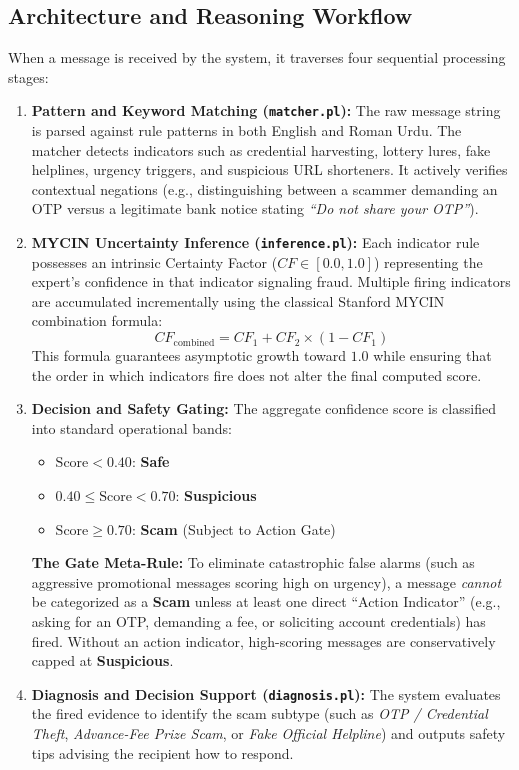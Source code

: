 \documentclass[11pt,a4paper]{article}
\begin{document}
\subsection{Architecture and Reasoning Workflow}
When a message is received by the system, it traverses four sequential processing stages:
\begin{enumerate}
    \item \textbf{Pattern and Keyword Matching (\texttt{matcher.pl}):} The raw message string is parsed against rule patterns in both English and Roman Urdu. The matcher detects indicators such as credential harvesting, lottery lures, fake helplines, urgency triggers, and suspicious URL shorteners. It actively verifies contextual negations (e.g., distinguishing between a scammer demanding an OTP versus a legitimate bank notice stating \textit{``Do not share your OTP''}).
    \item \textbf{MYCIN Uncertainty Inference (\texttt{inference.pl}):} Each indicator rule possesses an intrinsic Certainty Factor ($CF \in [0.0, 1.0]$) representing the expert's confidence in that indicator signaling fraud. Multiple firing indicators are accumulated incrementally using the classical Stanford MYCIN combination formula:
    \begin{equation}
        CF_{\text{combined}} = CF_1 + CF_2 \times (1 - CF_1)
    \end{equation}
    This formula guarantees asymptotic growth toward $1.0$ while ensuring that the order in which indicators fire does not alter the final computed score.
    \item \textbf{Decision and Safety Gating:} The aggregate confidence score is classified into standard operational bands:
    \begin{itemize}[noitemsep]
        \item $\text{Score} < 0.40$: \textcolor{safegreen}{\textbf{Safe}}
        \item $0.40 \le \text{Score} < 0.70$: \textcolor{warnamber}{\textbf{Suspicious}}
        \item $\text{Score} \ge 0.70$: \textcolor{scamred}{\textbf{Scam}} (Subject to Action Gate)
    \end{itemize}
    \textbf{The Gate Meta-Rule:} To eliminate catastrophic false alarms (such as aggressive promotional messages scoring high on urgency), a message \textit{cannot} be categorized as a \textbf{Scam} unless at least one direct ``Action Indicator'' (e.g., asking for an OTP, demanding a fee, or soliciting account credentials) has fired. Without an action indicator, high-scoring messages are conservatively capped at \textbf{Suspicious}.
    \item \textbf{Diagnosis and Decision Support (\texttt{diagnosis.pl}):} The system evaluates the fired evidence to identify the scam subtype (such as \textit{OTP / Credential Theft}, \textit{Advance-Fee Prize Scam}, or \textit{Fake Official Helpline}) and outputs safety tips advising the recipient how to respond.
\end{enumerate}
\end{document}
